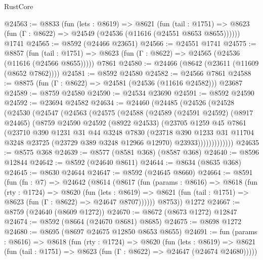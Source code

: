 \begin{lexlean}{RustCore}
\begin{coremodule}
@24563 := @8833
    (fun (lets : @8619) =>
    @8621
      (fun (tail : @1751) =>
      @8623 (fun (Γ : @8622) => @24549 (@24536 (@11616 (@24551 @8653 @8655))))))
    @1741
@24565 := @8592 (@24466 @23651)
@24566 := @24551 @1741
@24575 := @8857
    (fun (tail : @1751) => @8623 (fun (Γ : @8622) => @24565 (@24536 (@11616 (@24566 @8655)))))
    @7861
@24580 := @24466 (@8642 (@23611 (@11609 (@8652 @7862))))
@24581 := @8592 @24580
@24582 := @24566 @7861
@24588 := @8875 (fun (Γ : @8622) => @24581 (@24536 (@11616 @24582))) @23687
@24589 := @8759 @24580
@24590 := @24534 @23690
@24591 := @8592 @24590
@24592 := @23694 @24582
@24634 := @24460
    (@24485
      (@24526
        (@24528
          (@24530
            (@24547
              (@24563
                (@24575
                  (@24588
                    (@24589
                      (@24591 @24592)
                      (@8917 @24465)
                      (@8759
                        @24590
                        @24592
                        (@8922 @24533)
                        (@23705
                          @1259
                          @45
                          @7861
                          (@23710
                            @390
                            @1231
                            @31
                            @44
                            @3248
                            @7830
                            (@23718
                              @390
                              @1233
                              @31
                              @11704
                              @3248
                              @23725
                              (@23729 @389 @3248 @12966 @12970)
                              @23933)))))))))))))
@24635 := @8575 @368
@24639 := @8577 (@8581 @368) (@8587 @368)
@24640 := @8596 @12844
@24642 := @8592 (@24640 @8611)
@24644 := @8634 (@8635 @368)
@24645 := @8630 @24644
@24647 := @8592 (@24645 @8660)
@24664 := @8591
    (fun (fn : @7) =>
    @24642
      (@8614
        (@8617
          (fun (params : @8616) =>
          @8618
            (fun (rty : @1724) =>
            @8620
              (fun (lets : @8619) =>
              @8621 (fun (tail : @1751) => @8623 (fun (Γ : @8622) => @24647 @8707))))))
        @8753))
    @1272
@24667 := @8759 (@24640 (@8609 @1272))
@24670 := @8672 (@8673 @1272) @12847
@24674 := @8592 (@8664 (@24670 @8681) @8685)
@24675 := @8698 @1272
@24680 := @8695 (@8697 @24675 @12850 @8653 @8655)
@24691 := fun (params : @8616) =>
  @8618
    (fun (rty : @1724) =>
    @8620
      (fun (lets : @8619) =>
      @8621 (fun (tail : @1751) => @8623 (fun (Γ : @8622) => @24647 (@24674 @24680)))))

\end{coremodule}
\end{lexlean}
